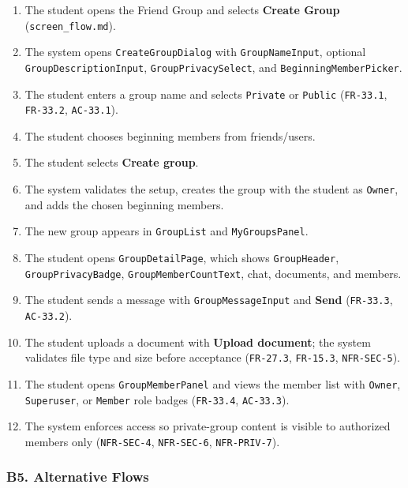 \documentclass[12pt]{article}
\begin{document}
\begin{enumerate}
\item The student opens the Friend Group and selects \textbf{Create Group} (\texttt{screen\_flow.md}).
\item The system opens \texttt{CreateGroupDialog} with \texttt{GroupNameInput}, optional \texttt{GroupDescriptionInput}, \texttt{GroupPrivacySelect}, and \texttt{BeginningMemberPicker}.
\item The student enters a group name and selects \texttt{Private} or \texttt{Public} (\texttt{FR-33.1}, \texttt{FR-33.2}, \texttt{AC-33.1}).
\item The student chooses beginning members from friends/users.
\item The student selects \textbf{Create group}.
\item The system validates the setup, creates the group with the student as \texttt{Owner}, and adds the chosen beginning members.
\item The new group appears in \texttt{GroupList} and \texttt{MyGroupsPanel}.
\item The student opens \texttt{GroupDetailPage}, which shows \texttt{GroupHeader}, \texttt{GroupPrivacyBadge}, \texttt{GroupMemberCountText}, chat, documents, and members.
\item The student sends a message with \texttt{GroupMessageInput} and \textbf{Send} (\texttt{FR-33.3}, \texttt{AC-33.2}).
\item The student uploads a document with \textbf{Upload document}; the system validates file type and size before acceptance (\texttt{FR-27.3}, \texttt{FR-15.3}, \texttt{NFR-SEC-5}).
\item The student opens \texttt{GroupMemberPanel} and views the member list with \texttt{Owner}, \texttt{Superuser}, or \texttt{Member} role badges (\texttt{FR-33.4}, \texttt{AC-33.3}).
\item The system enforces access so private-group content is visible to authorized members only (\texttt{NFR-SEC-4}, \texttt{NFR-SEC-6}, \texttt{NFR-PRIV-7}).
\end{enumerate}
\par\medskip

\hypertarget{sec:b5-alternative-flows}{}
\subsubsection*{B5. Alternative Flows}
\par\medskip
\end{document}
